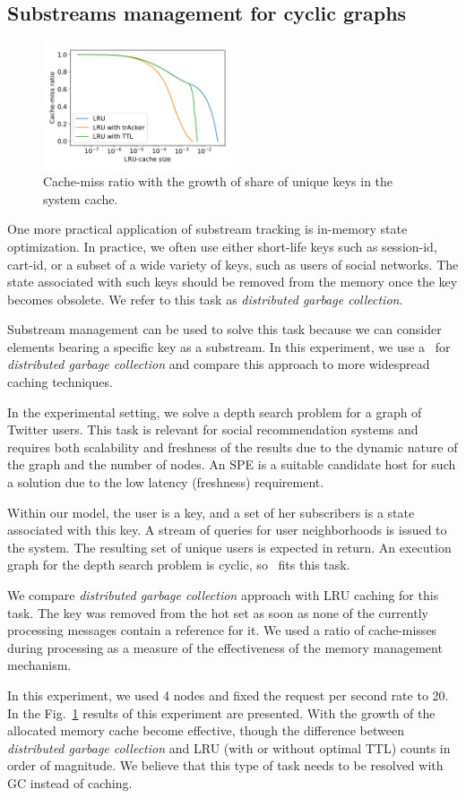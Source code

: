 \subsection{Substreams management for cyclic graphs}
\begin{figure}[htbp]
  \centering
  \includegraphics[width=0.50\textwidth]{pics/dgc_lru_depth_search.pdf}
  \caption{Cache-miss ratio with the growth of share of unique keys in the system cache.}
  \label{fig:dgc_lru_depth_search}
\end{figure}

One more practical application of substream tracking is in-memory state optimization. In practice, we often use either short-life keys such as session-id, cart-id, or a subset of a wide variety of keys, such as users of social networks. The state associated with such keys should be removed from the memory once the key becomes obsolete. We refer to this task as \textit{distributed garbage collection}.

Substream management can be used to solve this task because we can consider elements bearing a specific key as a substream. In this experiment, we use a \tracker\ for \textit{distributed garbage collection} and compare this approach to more widespread caching techniques.

In the experimental setting, we solve a depth search problem for a graph of Twitter users. This task is relevant for social recommendation systems and requires both scalability and freshness of the results due to the dynamic nature of the graph and the number of nodes. An SPE is a suitable candidate host for such a solution due to the low latency (freshness) requirement. 

Within our model, the user is a key, and a set of her subscribers is a state associated with this key. A stream of queries for user neighborhoods is issued to the system. The resulting set of unique users is expected in return. An execution graph for the depth search problem is cyclic, so \tracker\ fits this task. 

We compare \textit{distributed garbage collection} approach with LRU caching for this task. The key was removed from the hot set as soon as none of the currently processing messages contain a reference for it. We used a ratio of cache-misses during processing as a measure of the effectiveness of the memory management mechanism. 

In this experiment, we used 4 nodes and fixed the request per second rate to 20. In the Fig.~\ref{fig:dgc_lru_depth_search} results of this experiment are presented. With the growth of the allocated memory cache become effective, though the difference between 
\textit{distributed garbage collection} and LRU (with or without optimal TTL) counts in order of magnitude. We believe that this type of task needs to be resolved with GC instead of caching.
